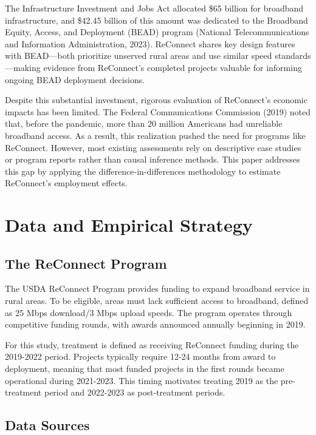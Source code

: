 \documentclass[12pt]{article}
\begin{document}
The Infrastructure Investment and Jobs Act allocated \$65 billion for broadband infrastructure, and \$42.45 billion of this amount was dedicated to the Broadband Equity, Access, and Deployment (BEAD) program (National Telecommunications and Information Administration, 2023). ReConnect shares key design features with BEAD—both prioritize unserved rural areas and use similar speed standards—making evidence from ReConnect’s completed projects valuable for informing ongoing BEAD deployment decisions.

Despite this substantial investment, rigorous evaluation of ReConnect’s economic impacts has been limited. The Federal Communications Commission (2019) noted that, before the pandemic, more than 20 million Americans had unreliable broadband access. As a result, this realization pushed the need for programs like ReConnect. However, most existing assessments rely on descriptive case studies or program reports rather than causal inference methods. This paper addresses this gap by applying the difference-in-differences methodology to estimate ReConnect’s employment effects.

\section{Data and Empirical Strategy}

\subsection{The ReConnect Program}

The USDA ReConnect Program provides funding to expand broadband service in rural areas. To be eligible, areas must lack sufficient access to broadband, defined as 25 Mbps download/3 Mbps upload speeds. The program operates through competitive funding rounds, with awards announced annually beginning in 2019.

For this study, treatment is defined as receiving ReConnect funding during the 2019-2022 period. Projects typically require 12-24 months from award to deployment, meaning that most funded projects in the first rounds became operational during 2021-2023. This timing motivates treating 2019 as the pre-treatment period and 2022-2023 as post-treatment periods.

\subsection{Data Sources}
\end{document}
